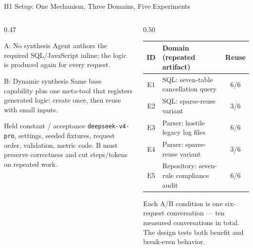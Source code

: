 \documentclass[aspectratio=169,11pt]{beamer}
\begin{document}
\begin{frame}{H1 Setup: One Mechanism, Three Domains, Five Experiments}
  \scriptsize
  \begin{columns}[T,totalwidth=\textwidth]
    \begin{column}{0.47\textwidth}
      \begin{block}{A: No synthesis}
        Agent authors the required SQL/JavaScript inline; the logic is
        produced again for every request.
      \end{block}
      \vspace{0.12cm}
      \begin{exampleblock}{B: Dynamic synthesis}
        Same base capability plus one meta-tool that registers generated
        logic: create once, then reuse with small inputs.
      \end{exampleblock}
      \vspace{0.12cm}
      \begin{block}{Held constant / acceptance}
        \texttt{deepseek-v4-pro}, settings, seeded fixtures, request order,
        validation, metric code. B must preserve correctness and cut
        steps/tokens on repeated work.
      \end{block}
    \end{column}
    \begin{column}{0.50\textwidth}
      \renewcommand{\arraystretch}{1.28}
      \begin{tabular}{clc}
        \toprule
        \textbf{ID} & \textbf{Domain (repeated artifact)} & \textbf{Reuse} \\
        \midrule
        E1 & SQL: seven-table cancellation query & 6/6 \\
        E2 & SQL: sparse-reuse variant & 3/6 \\
        E3 & Parser: hostile legacy log files & 6/6 \\
        E4 & Parser: sparse-reuse variant & 3/6 \\
        E5 & Repository: seven-rule compliance audit & 6/6 \\
        \bottomrule
      \end{tabular}
      \vspace{0.25cm}

      Each A/B condition is one six-request conversation --- ten measured
      conversations in total. The design tests both benefit and break-even
      behavior.
    \end{column}
  \end{columns}
\end{frame}
\end{document}
